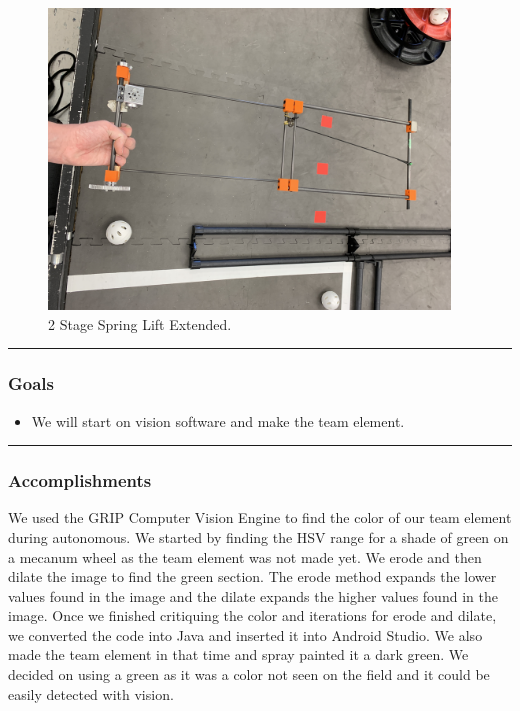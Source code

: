 \begin{figure}[htp]
\centering
  \includegraphics[width=0.95\textwidth]{Meetings/October/10-28-21/10-28-21_Hardware_Figure3 - Nathan Forrer.JPG}
  \caption{2 Stage Spring Lift Extended.}
  \label{fig:102821_3}
\end{figure}

\noindent\hfil\rule{\textwidth}{.4pt}\hfil
\subsubsection*{Goals}
\begin{itemize}
    \item We will start on vision software and make the team element.

\end{itemize} 

\noindent\hfil\rule{\textwidth}{.4pt}\hfil

\subsubsection*{Accomplishments}
We used the GRIP Computer Vision Engine to find the color of our team element during autonomous. We started by finding the HSV range for a shade of green on a mecanum wheel as the team element was not made yet. We erode and then dilate the image to find the green section. The erode method expands the lower values found in the image and the dilate expands the higher values found in the image. Once we finished critiquing the color and iterations for erode and dilate, we converted the code into Java and inserted it into Android Studio. We also made the team element in that time and spray painted it a dark green. We decided on using a green as it was a color not seen on the field and it could be easily detected with vision.


